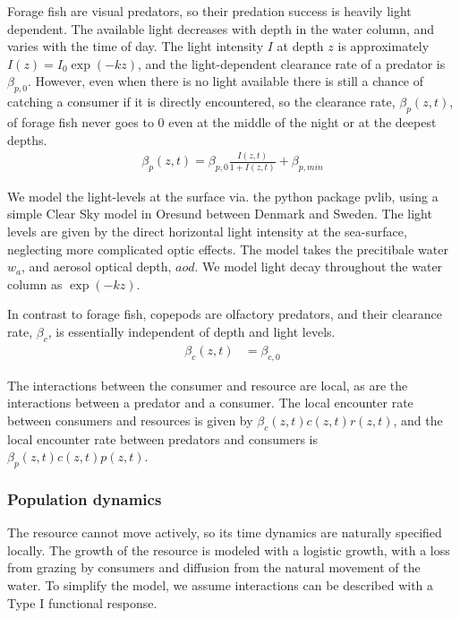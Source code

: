 Forage fish are visual predators, so their predation success is heavily light dependent. The available light decreases with depth in the water column, and varies with the time of day.
The light intensity $I$ at depth $z$ is approximately $I(z) = I_0\exp(-kz)$, and the light-dependent clearance rate of a predator is $\beta_{p,0}$.  However, even when there is no light available there is still a chance of catching a consumer if it is directly encountered,  so the clearance rate, $\beta_p(z,t)$, of forage fish never goes to 0 even at the middle of the night or at the deepest depths.
\begin{align*}
  \beta_p(z,t) = \beta_{p,0} \frac{I(z,t)}{1+I(z,t)} + \beta_{p,min}
\end{align*}


We model the light-levels at the surface via. the python package pvlib, using a simple Clear Sky model in Oresund between Denmark and Sweden. The light levels are given by the direct horizontal light intensity at the sea-surface, neglecting more complicated optic effects. The model takes the precitibale water $w_a$, and aerosol optical depth, $aod$. We model light decay throughout the water column as $\exp(-kz)$.


In contrast to forage fish, copepods are olfactory predators, and their clearance rate, $\beta_c$, is essentially independent of depth and light levels.
\begin{align*}
	\beta_c(z,t) &=  \beta_{c,0}
\end{align*}

The interactions between the consumer and resource are local, as are the interactions between a predator and a consumer. The local encounter rate between consumers and resources is given by $\beta_c(z,t)c(z,t)r(z,t)$, and the local encounter rate between predators and consumers is $\beta_p(z,t)c(z,t)p(z,t)$.

\subsubsection*{Population dynamics}

The resource cannot move actively, so its time dynamics are naturally specified locally. The growth of the resource is modeled with a logistic growth, with a loss from grazing by consumers and diffusion from the natural movement of the water. To simplify the model, we assume interactions can be described with a Type I functional response. %


